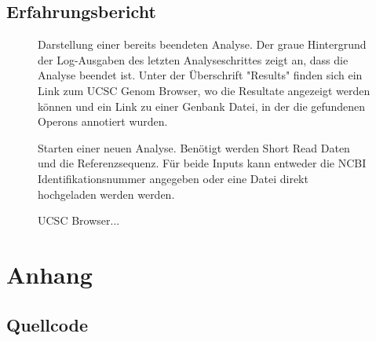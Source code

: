 \documentclass[a4paper]{thesis}
\begin{document}
\subsection{Erfahrungsbericht}

\begin{figure}[h]\centering
{}
\caption[Screenshot 1]{
	Darstellung einer bereits beendeten Analyse. Der graue Hintergrund
	der Log-Ausgaben des letzten Analyseschrittes zeigt an, dass die
	Analyse beendet ist. Unter der Überschrift "Results" finden sich
	ein Link zum UCSC Genom Browser, wo die Resultate angezeigt werden
	können und ein Link zu einer Genbank Datei, in der die gefundenen
	Operons annotiert wurden.
}
\label{fig:screen1}
\end{figure}

\begin{figure}[h]\centering
{}
\caption[Screenshot 2]{
	Starten einer neuen Analyse. Benötigt werden Short Read Daten und
	die Referenzsequenz. Für beide Inputs kann entweder die NCBI
	Identifikationsnummer angegeben oder eine Datei direkt
	hochgeladen werden werden.
}
\label{fig:screen2}
\end{figure}

\begin{figure}[h]\centering
{}
\caption[Screenshot 3]{
	UCSC Browser...
}
\label{fig:screen3}
\end{figure}







\newpage
\section{Anhang}
\renewcommand\stctitle{Inhalt}
\secttoc
\subsection{Quellcode}

\paragraphmark{}
\end{document}
